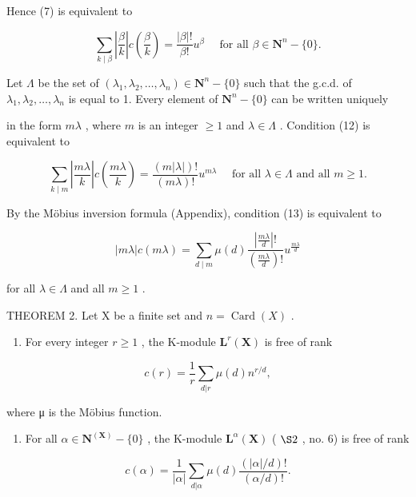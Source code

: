 Hence (7) is equivalent to

\[
\sum_ {k \mid \beta} \left| \frac {\beta}{k} \right| c \left(\frac {\beta}{k}\right) = \frac {| \beta | !}{\beta !} u ^ {\beta} \quad \text { for   all } \beta \in \mathbf {N} ^ {n} - \{0 \}.\tag{12}
\]

Let \(\Lambda\) be the set of \((\lambda_1, \lambda_2, \ldots, \lambda_n) \in \mathbf{N}^n - \{0\}\) such that the g.c.d. of \(\lambda_1, \lambda_2, \ldots, \lambda_n\) is equal to 1. Every element of \(\mathbf{N}^n - \{0\}\) can be written uniquely

in the form \(m\lambda\) , where \(m\) is an integer \(\geqslant 1\) and \(\lambda \in \Lambda\) . Condition (12) is equivalent to

\[
\sum_ {k \mid m} \left| \frac {m \lambda}{k} \right| c \left(\frac {m \lambda}{k}\right) = \frac {(m | \lambda |) !}{(m \lambda) !} u ^ {m \lambda} \quad \text { for   all } \lambda \in \Lambda \text { and   all } m \geqslant 1.\tag{13}
\]

By the Möbius inversion formula (Appendix), condition (13) is equivalent to

\[
\left| m \lambda \right| c (m \lambda) = \sum_ {d \mid m} \mu (d) \frac {\left| \frac {m \lambda}{d} \right| !}{\left(\frac {m \lambda}{d}\right) !} u ^ {\frac {m \lambda}{d}}\tag{14}
\]

for all \(\lambda\in\Lambda\) and all \(m\geqslant1\) .

THEOREM 2. Let X be a finite set and \(n = \operatorname{Card}(X)\) .

\begin{enumerate}
\def\labelenumi{(\alph{enumi})}
\tightlist
\item
  For every integer \(r \geqslant 1\) , the K-module \(\mathbf{L}^r(\mathbf{X})\) is free of rank
\end{enumerate}

\[
c (r) = \frac {1}{r} \sum_ {d | r} \mu (d) n ^ {r / d},\tag{15}
\]

where μ is the Möbius function.

\begin{enumerate}
\def\labelenumi{(\alph{enumi})}
\setcounter{enumi}{1}
\tightlist
\item
  For all \(\alpha \in \mathbf{N}^{(\mathbf{X})} - \{0\}\) , the K-module \(\mathbf{L}^{\alpha}(\mathbf{X})\) ( \(\S 2\) , no. 6) is free of rank
\end{enumerate}

\[
c (\alpha) = \frac {1}{| \alpha |} \sum_ {d | \alpha} \mu (d) \frac {(| \alpha | / d) !}{(\alpha / d) !}.\tag{16}
\]


